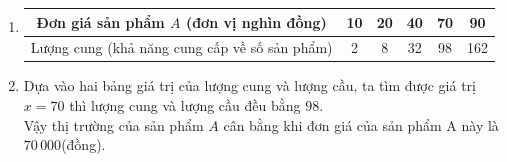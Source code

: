 \begin{bt}
{\begin{enumerate}
			Hàm số có tập xác định $\mathscr{D}=\{10;20;40;70;90\}$ và tập giá trị $\mathscr{T}=\{338;288;200;98;50\}$.\\
			\item \hfill
			\begin{center}
				\begin{tabular}{|c|c|c|c|c|c|}
					\hline Đơn giá sản phẩm $A$ (đơn vị nghìn đồng) & 10 & 20 & 40 & 70 & 90 \\
					\hline Lượng cung (khả năng cung cấp về số sản phẩm) & 2 & 8 & 32 & 98 & 162 \\
					\hline
				\end{tabular}
			\end{center}
			\item Dựa vào hai bảng giá trị của lượng cung và lượng cầu, ta tìm được giá trị $x=70$ thì lượng cung và lượng cầu đều bằng $98$.\\
			Vậy thị trường của sản phẩm $A$ cân bằng khi đơn giá của sản phẩm $\mathrm{A}$ này là $70\,000$(đồng).
		\end{enumerate}
	}
\end{bt}

